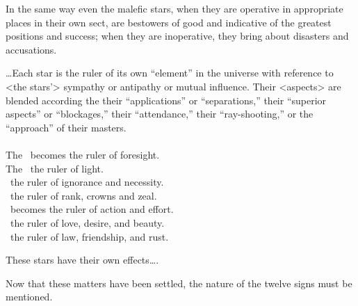 \mnmb[0.2cm] 
In the same way even the  malefic stars, when they are operative in appropriate places in their own sect, are bestowers of good and indicative of the greatest positions and success; when they are inoperative, they bring about disasters and accusations.

\mnm[0.2cm]
\ldots Each star is the ruler of its own “element” in the universe with reference to <the stars’> sympathy or
antipathy or mutual influence. Their <aspects> are blended according the their “applications” or
“separations,” their “superior aspects” or “blockages,” their “attendance,” their “ray-shooting,” or the
“approach” of their masters. \\
\\
The \Moon\,  becomes the ruler of foresight. \\
The \Sun\,  the ruler of light. \\
\Saturn\,  the ruler of ignorance and necessity. \\
\Jupiter\, the ruler of rank, crowns and zeal. \\
\Mars\, becomes the ruler of action and effort. \\
\Venus\, the ruler of love, desire, and beauty. \\
\Mercury\,  the ruler of law, friendship, and rust. 

These stars have their own effects\ldots.

Now that these matters have been settled, the nature of the twelve signs must be mentioned.
\newpage